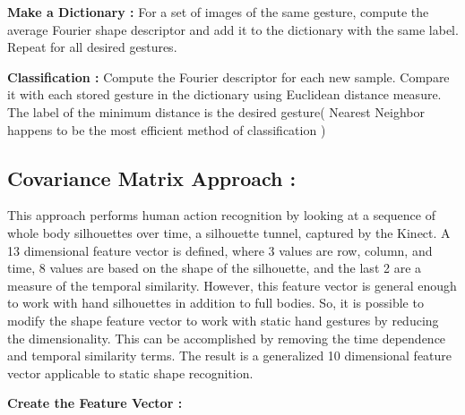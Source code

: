 \textbf{Make a Dictionary : } For a set of images of the same gesture, compute the average Fourier shape descriptor and add it to the dictionary with the same label.  Repeat for all desired gestures.

\textbf{Classification  : }Compute the Fourier descriptor for each new sample.  Compare it with each stored gesture in the dictionary using  Euclidean distance measure.  The label of the minimum distance is the desired gesture( Nearest Neighbor happens to be the most efficient method of classification )

\subsection{Covariance Matrix Approach :}
This approach \cite{21}
performs human action recognition by looking at a sequence of whole body silhouettes
over time, a silhouette tunnel, captured by the Kinect. A 13 dimensional feature vector
is defined, where 3 values are row, column, and time, 8 values are based on the shape of
the silhouette, and the last 2 are a measure of the temporal similarity.
However, this feature vector is general enough to work with hand silhouettes in addition
to full bodies. So, it is possible to modify the shape feature vector to work with static
hand gestures by reducing the dimensionality. This can be accomplished by removing
the time dependence and temporal similarity terms. The result is a generalized 10
dimensional feature vector applicable to static shape recognition.

\textbf{Create the Feature Vector :}

